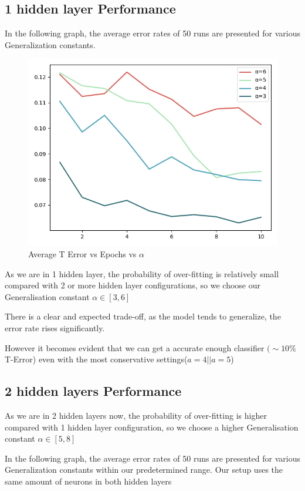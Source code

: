 \documentclass{proc}
\begin{document}
	\subsection{1 hidden layer Performance}
	In the following graph, the average error rates of 50 runs are presented for various Generalization constants.
	\begin{figure}[!h]
		\includegraphics[width=\linewidth]{genone.png}
		\caption{Average T Error vs Epochs vs $\alpha$}
		\label{fig:1-X-1}
	\end{figure}

	As we are in 1 hidden layer, the probability of over-fitting is relatively small compared with 2 or more hidden layer configurations, so we choose our Generalisation constant $\alpha \in [3,6]$
	
	There is a clear and expected trade-off, as the model tends to generalize, the error rate rises significantly.

	However it becomes evident that we can get a accurate enough classifier $(\sim 10\% $ T-Error) even with the most conservative settings(${a=4  || a=5}$)
	\subsection{2 hidden layers Performance}
	As we are in 2 hidden layers now, the probability of over-fitting is higher compared with 1 hidden layer configuration, so we choose a higher Generalisation constant  $\alpha \in [5,8]$
	
	In the following graph, the average error rates of 50 runs are presented for various Generalization constants within our predetermined range. Our setup uses the same amount of neurons in both hidden layers
	
\end{document}

